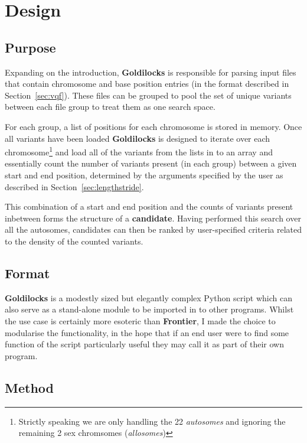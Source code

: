 \section{Design}
\subsection{Purpose}
\label{sec:goldilocks-purpose}

Expanding on the introduction, \textbf{Goldilocks} is responsible for parsing
input files that contain chromosome and base position entries (in the format
described in Section~\ref{sec:vqf}). These files can be grouped to pool the set
of unique variants between each file group to treat them as one search space.

For each group, a list of positions for each chromosome is stored in
memory. Once all variants have been loaded \textbf{Goldilocks} is designed to
iterate over each chromosome\footnote{Strictly speaking we are only handling the
22 \textit{autosomes} and ignoring the remaining 2 sex chromsomes
(\textit{allosomes})} and load all of the variants from the lists in to an array
and essentially count the number of variants present (in each group) between a
given start and end position, determined by the arguments specified by the user
as described in Section~\ref{sec:lengthstride}.

This combination of a start and end position and the counts of variants present
inbetween forms the structure of a \textbf{candidate}. Having performed this
search over all the autosomes, candidates can then be ranked by user-specified
criteria related to the density of the counted variants.


\subsection{Format}

\textbf{Goldilocks} is a modestly sized but elegantly complex Python script
which can also serve as a stand-alone module to be imported in to other
programs. Whilst the use case is certainly more esoteric than \textbf{Frontier},
I made the choice to modularise the functionality, in the hope that if an end
user were to find some function of the script particularly useful they may call
it as part of their own program.


\subsection{Method}

